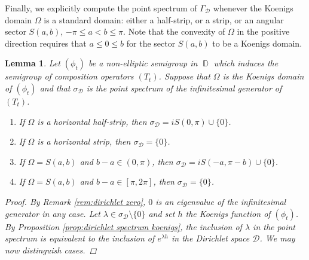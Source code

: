 \documentclass[11pt]{amsart}
\numberwithin{equation}{section}
\newtheorem{lemma}[theorem]{Lemma}
\theoremstyle{definition}
\DeclareMathOperator{\D}{\mathbb{D}}
\begin{document}
	Finally, we explicitly compute the point spectrum of $\Gamma_\mathcal{D}$ whenever the Koenigs domain $\Omega$ is a standard domain: either a half-strip, or a strip, or an angular sector $S(a,b)$, $-\pi\le a<b \le\pi$. Note that the convexity of $\Omega$ in the positive direction requires that $a\le 0\le b$ for the sector $S(a,b)$ to be a Koenigs domain.
	
	\begin{lemma}\label{lm:dirichlet standard domain}
		Let $(\phi_t)$ be a non-elliptic semigroup in $\D$ which induces the semigroup of composition operators $(T_t)$. Suppose that $\Omega$ is the Koenigs domain of $(\phi_t)$ and that $\sigma_\mathcal{D}$ is the point spectrum of the infinitesimal generator of $(T_t)$.
		\begin{enumerate}
			\item[\textup{(a)}] If $\Omega$ is a horizontal half-strip, then $\sigma_\mathcal{D}=iS(0,\pi)\cup\{0\}$.
			\item[\textup{(b)}] If $\Omega$ is a horizontal strip, then $\sigma_\mathcal{D}=\{0\}$.
			\item[\textup{(c)}] If $\Omega=S(a,b)$ and $b-a\in(0,\pi)$, then $\sigma_\mathcal{D}=iS(-a,\pi-b)\cup\{0\}$.
			\item[\textup{(d)}] If $\Omega=S(a,b)$ and $b-a\in[\pi,2\pi]$, then $\sigma_\mathcal{D}=\{0\}$.
		\end{enumerate}
		\begin{proof}
			By Remark \ref{rem:dirichlet zero}, $0$ is an eigenvalue of the infinitesimal generator in any case. Let $\lambda\in\sigma_\mathcal{D}\setminus\{0\}$ and set $h$ the Koenigs function of $(\phi_t)$. By Proposition \ref{prop:dirichlet spectrum koenigs}, the inclusion of $\lambda$ in the point spectrum is equivalent to the inclusion of $e^{\lambda h}$ in the Dirichlet space $\mathcal{D}$. We may now distinguish cases.
			

\end{proof}
\end{lemma}
\end{document}

